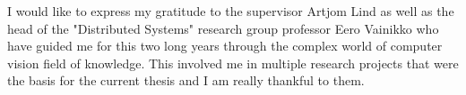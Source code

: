 \documentclass[../main.tex]{subfiles}
\begin{document}
I would like to express my gratitude to the supervisor Artjom Lind as well as the head of the "Distributed Systems" research group professor Eero Vainikko who have guided me for this two long years through the complex world of computer vision field of knowledge. This involved me in multiple research projects that were the basis for the current thesis and I am really thankful to them.
\end{document}
